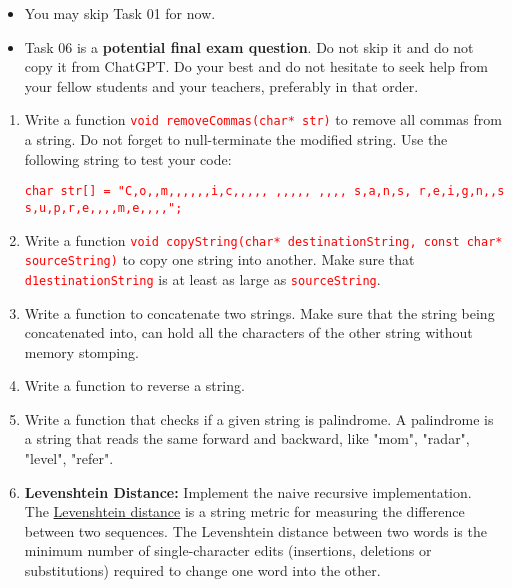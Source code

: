 \documentclass[12pt]{article}
\begin{document}
\begin{itemize}
    \item You may skip Task 01 for now. 
    \item Task 06 is a \textbf{potential final exam question}. Do not skip it and do not copy it from ChatGPT. Do your best and do not hesitate to seek help from your fellow students and your teachers, preferably in 
    that order.
\end{itemize}

\begin{enumerate}
    \item Write a function \textcolor{red}{\texttt{void removeCommas(char* str)}} to remove all commas from a string. Do not forget to null-terminate the modified string. Use the following 
    string to test your code:

    \textcolor{red}{\texttt{char str[] = "C,o,,m,,,,,,i,c,,,,,  ,,,,, ,,,, s,a,n,s, r,e,i,g,n,,s s,u,p,r,e,,,,m,e,,,,";}}

    \item Write a function \textcolor{red}{\texttt{void copyString(char* destinationString, const char* sourceString)}} to copy one string into another. Make sure that 
    \textcolor{red}{\texttt{d1estinationString}} is at least as large as \textcolor{red}{\texttt{sourceString}}.

    \item Write a function to concatenate two strings. Make sure that the string being concatenated into, can hold all the characters of the other string without memory stomping.

    \item Write a function to reverse a string.
    
    \item Write a function that checks if a given string is palindrome. A palindrome is a string that reads the same forward and backward, like "mom", "radar", "level", "refer".

    \item \textbf{Levenshtein Distance:} Implement the naive recursive implementation. \\
    
    The \href{https://en.wikipedia.org/wiki/Levenshtein_distance}{Levenshtein distance} is a string metric for measuring the difference between two sequences. The Levenshtein distance between two words is the minimum number of single-character edits (insertions, deletions or substitutions) required to change one word into the other. \\
    

\end{enumerate}
\end{document}
